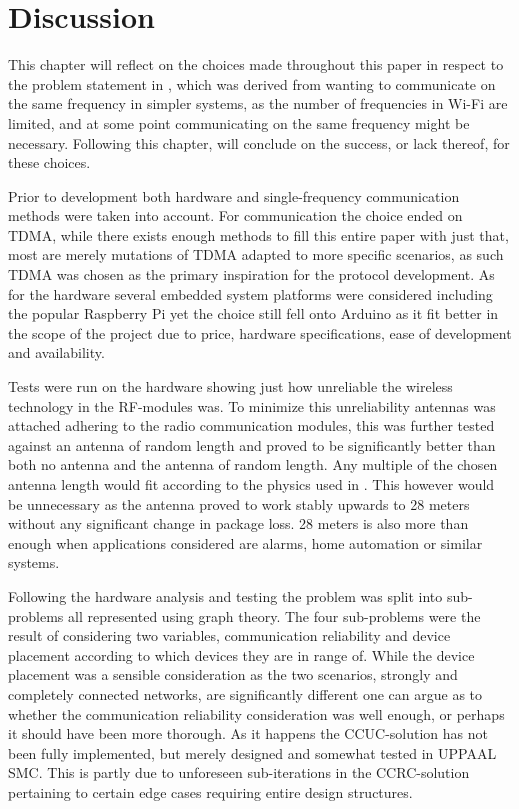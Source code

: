 \chapter{Discussion}\label{Discussion}
This chapter will reflect on the choices made throughout this paper in respect to the problem statement in , which was derived from wanting to communicate on the same frequency in simpler systems, as the number of frequencies in Wi-Fi are limited, and at some point communicating on the same frequency might be necessary.
Following this chapter,  will conclude on the success, or lack thereof, for these choices.

\bigskip \noindent
Prior to development both hardware and single-frequency communication methods were taken into account.
For communication the choice ended on TDMA, while there exists enough methods to fill this entire paper with just that, most are merely mutations of TDMA adapted to more specific scenarios, as such TDMA was chosen as the primary inspiration for the protocol development.
As for the hardware several embedded system platforms were considered including the popular Raspberry Pi yet the choice still fell onto Arduino as it fit better in the scope of the project due to price, hardware specifications, ease of development and availability.

Tests were run on the hardware showing just how unreliable the wireless technology in the RF-modules was.
To minimize this unreliability antennas was attached adhering to the radio communication modules, this was further tested against an antenna of random length and proved to be significantly better than both no antenna and the antenna of random length.
Any multiple of the chosen antenna length would fit according to the physics used in .
This however would be unnecessary as the antenna proved to work stably upwards to 28 meters without any significant change in package loss.
28 meters is also more than enough when applications considered are alarms, home automation or similar systems.

\bigskip \noindent
Following the hardware analysis and testing the problem was split into sub-problems all represented using graph theory.
The four sub-problems were the result of considering two variables, communication reliability and device placement according to which devices they are in range of.
While the device placement was a sensible consideration as the two scenarios, strongly and completely connected networks, are significantly different one can argue as to whether the communication reliability consideration was well enough, or perhaps it should have been more thorough.
As it happens the CCUC-solution has not been fully implemented, but merely designed and somewhat tested in UPPAAL SMC.
This is partly due to unforeseen sub-iterations in the CCRC-solution pertaining to certain edge cases requiring entire design structures.

